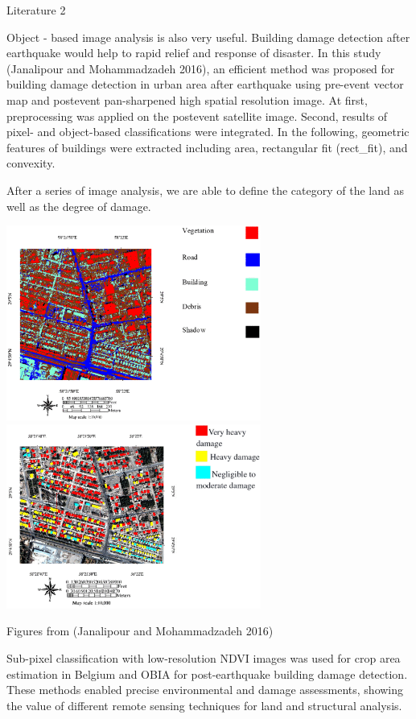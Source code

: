 \documentclass[
  letterpaper,
  DIV=11,
  numbers=noendperiod]{scrreprt}
\begin{document}
Literature 2

Object - based image analysis is also very useful. Building damage
detection after earthquake would help to rapid relief and response of
disaster. In this study (Janalipour and Mohammadzadeh 2016), an
efficient method was proposed for building damage detection in urban
area after earthquake using pre-event vector map and postevent
pan-sharpened high spatial resolution image. At first, preprocessing was
applied on the postevent satellite image. Second, results of pixel- and
object-based classifications were integrated. In the following,
geometric features of buildings were extracted including area,
rectangular fit (rect\_fit), and convexity.~

After a series of image analysis, we are able to define the category of
the land as well as the degree of damage.

\includegraphics[width=3.29167in,height=\textheight]{OBIA.png}\includegraphics[width=3.29167in,height=\textheight]{OBIA_b.png}

Figures from (Janalipour and Mohammadzadeh 2016)

Sub-pixel classification with low-resolution NDVI images was used for
crop area estimation in Belgium and OBIA for post-earthquake building
damage detection. These methods enabled precise environmental and damage
assessments, showing the value of different remote sensing techniques
for land and structural analysis.
\end{document}
